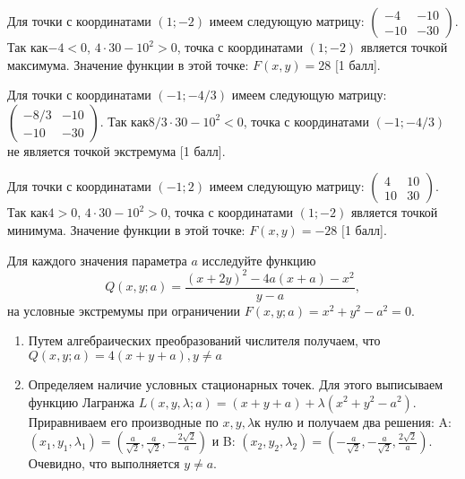 \documentclass[addpoints, answers]{exam} %
\begin{document}
\begin{questions}
\begin{solution}
Для точки с координатами $\left(1;-2\right)$ имеем следующую матрицу: $\left(\begin{array}{cc} {-4} & {-10} \\ {-10} & {-30} \end{array}\right)$. Так как$-4<0$, $4\cdot 30-10^{2} >0$, точка с координатами $\left(1;-2\right)$ является точкой максимума. Значение функции в этой точке: $F(x,y)=28$ $[$1 балл].

Для точки с координатами $\left(-1;-4/3\right)$ имеем следующую матрицу: $\left(\begin{array}{cc} {-8/3} & {-10} \\ {-10} & {-30} \end{array}\right)$. Так как$8/3\cdot 30-10^{2} <0$, точка с координатами $\left(-1;-4/3\right)$ не является точкой экстремума $[$1 балл].

Для точки с координатами $\left(-1;2\right)$ имеем следующую матрицу: $\left(\begin{array}{cc} {4} & {10} \\ {10} & {30} \end{array}\right)$. Так как$4>0$, $4\cdot 30-10^{2} >0$, точка с координатами $\left(1;-2\right)$ является точкой минимума. Значение функции в этой точке: $F(x,y)=-28$ $[$1 балл].
\end{solution}


\question[10] Для каждого значения параметра $a$ исследуйте функцию 
\[
Q(x,y;a)=\frac{(x+2y)^2-4a(x+a)-x^2}{y-a},
\]
на условные экстремумы при ограничении $F(x,y;a)=x^2+y^2-a^2=0$.


\begin{solution}

\begin{enumerate}
\item  Путем алгебраических преобразований числителя получаем, что $Q\left(x,y;a\right)=4\left(x+y+a\right),y\ne a$

\item  Определяем наличие условных стационарных точек. Для этого выписываем функцию Лагранжа $L\left(x,y,\lambda ;a\right)=\left(x+y+a\right)+\lambda \left(x^{2} +y^{2} -a^{2} \right)$. Приравниваем его производные по $x,y,\lambda $к нулю и получаем два решения: A: $\left(x_{1} ,y_{1} ,\lambda _{1} \right)=\left(\frac{a}{\sqrt{2} } ,\frac{a}{\sqrt{2} } ,-\frac{2\sqrt{2} }{a} \right)$ и B: $\left(x_{2} ,y_{2} ,\lambda _{2} \right)=\left(-\frac{a}{\sqrt{2} } ,-\frac{a}{\sqrt{2} } ,\frac{2\sqrt{2} }{a} \right)$. Очевидно, что выполняется $y\ne a$.


\end{enumerate}
\end{solution}
\end{questions}
\end{document}

